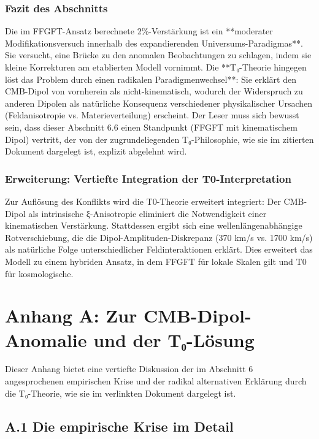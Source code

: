 	\subsubsection*{Fazit des Abschnitts}
	
	Die im FFGFT-Ansatz berechnete 2\%-Verstärkung ist ein **moderater Modifikationsversuch innerhalb des expandierenden Universums-Paradigmas**. Sie versucht, eine Brücke zu den anomalen Beobachtungen zu schlagen, indem sie kleine Korrekturen am etablierten Modell vornimmt. Die **T₀-Theorie hingegen löst das Problem durch einen radikalen Paradigmenwechsel**: Sie erklärt den CMB-Dipol von vornherein als nicht-kinematisch, wodurch der Widerspruch zu anderen Dipolen als natürliche Konsequenz verschiedener physikalischer Ursachen (Feldanisotropie vs. Materieverteilung) erscheint. Der Leser muss sich bewusst sein, dass dieser Abschnitt 6.6 einen Standpunkt (FFGFT mit kinematischem Dipol) vertritt, der von der zugrundeliegenden T₀-Philosophie, wie sie im zitierten Dokument dargelegt ist, explizit abgelehnt wird.
	
	\subsubsection*{Erweiterung: Vertiefte Integration der T0-Interpretation}
	Zur Auflösung des Konflikts wird die T0-Theorie erweitert integriert: Der CMB-Dipol als intrinsische ξ-Anisotropie eliminiert die Notwendigkeit einer kinematischen Verstärkung. Stattdessen ergibt sich eine wellenlängenabhängige Rotverschiebung, die die Dipol-Amplituden-Diskrepanz (370 km/s vs. 1700 km/s) als natürliche Folge unterschiedlicher Feldinteraktionen erklärt. Dies erweitert das Modell zu einem hybriden Ansatz, in dem FFGFT für lokale Skalen gilt und T0 für kosmologische.
	
	\section*{Anhang A: Zur CMB-Dipol-Anomalie und der T₀-Lösung}
	
	Dieser Anhang bietet eine vertiefte Diskussion der im Abschnitt 6 angesprochenen empirischen Krise und der radikal alternativen Erklärung durch die T₀-Theorie, wie sie im verlinkten Dokument dargelegt ist.
	
	\subsection*{A.1 Die empirische Krise im Detail}
	
